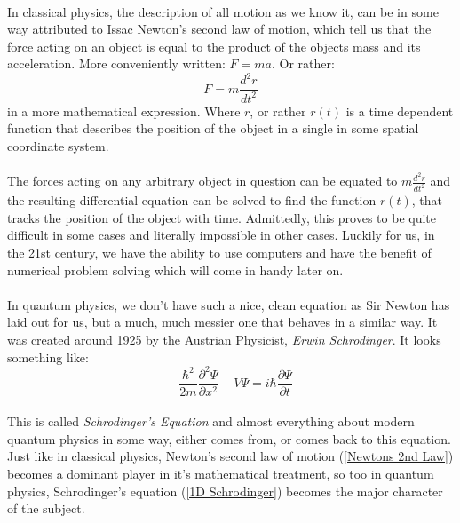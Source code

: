 \documentclass[12pt,letterpaper]{book}
\begin{document}
\paragraph*{}In classical physics, the description of all motion as we know it, can be in some way attributed to Issac Newton's second law of motion, which tell us that the force acting on an object is equal to the product of the objects mass and its acceleration. More conveniently written: $F = ma$. Or rather:
\begin{equation}
\label{Newtons 2nd Law}
F = m\frac{d^2r}{dt^2}
\end{equation} 
in a more mathematical expression. Where $r$, or rather $r(t)$ is a time dependent function that describes the position of the object in a single in some spatial coordinate system.
\paragraph*{}The forces acting on any arbitrary object in question can be equated to $m\frac{d^2r}{dt^2}$ and the resulting differential equation can be solved to find the function $r(t)$, that tracks the position of the object with time. Admittedly, this proves to be quite difficult in some cases and literally impossible in other cases. Luckily for us, in the 21st century, we have the ability to use computers and have the benefit of numerical problem solving which will come in handy later on.
\paragraph*{}In quantum physics, we don't have such a nice, clean equation as Sir Newton has laid out for us, but a much, much messier one that behaves in a similar way. It was created around 1925 by the Austrian Physicist, \textit{Erwin Schrodinger}. It looks something like:
\begin{equation}
\label{1D Schrodinger}
-\frac{\hbar^2}{2m}\frac{\partial^2\Psi}{\partial x^2} +
V\Psi = i\hbar\frac{\partial \Psi}{\partial t}
\end{equation}
\paragraph*{}This is called \textit{Schrodinger's Equation} and almost everything about modern quantum physics in some way, either comes from, or comes back to this equation. Just like in classical physics, Newton's second law of motion (\ref{Newtons 2nd Law}) becomes a dominant player in it's mathematical treatment, so too in quantum physics, Schrodinger's equation (\ref{1D Schrodinger}) becomes the major character of the subject.
\end{document}
